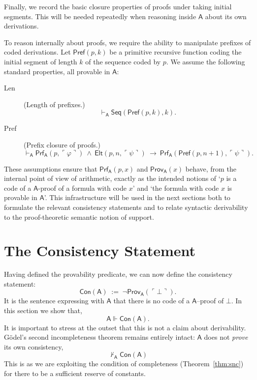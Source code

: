 \documentclass[reqno]{asl}
\makeatletter
\def\namedlabel#1#2{\begingroup
   \def\@currentlabel{#2}%
   \label{#1}\endgroup
}
\newcommand{\proves}{\vdash}
\newcommand{\supp}{\Vdash}
\newcommand{\pa}{\textsf{A}}
\newcommand{\Prf}{\textsf{Prf}}
\newcommand{\Seq}{\textsf{Seq}}
\newcommand{\Prov}{\textsf{Prov}}
\newcommand{\Con}{\textsf{Con}}
\newcommand{\Elt}{\textsf{Elt}}
\newcommand{\Pre}{\textsf{Pref}}
\makeatother
\begin{document}
Finally, we record the basic closure properties of proofs under taking initial segments. This will be needed repeatedly when reasoning inside $\pa$ about its own derivations.

To reason internally about proofs, we require the ability to manipulate prefixes of coded derivations. Let $\Pre(p,k)$ be a primitive recursive function coding the initial segment of length $k$ of the sequence coded by $p$. We assume the following standard properties, all provable in $\pa$:

\begin{description}
\item[Len] \namedlabel{desc:prefix-length}{\textbf{Len}} (Length of prefixes.)
\[
\proves_{\pa} \Seq(\Pre(p,k),k).
\]

\item[Pref] \namedlabel{desc:prefix-closure}{\textbf{Pref}} (Prefix closure of proofs.)
\[
\proves_{\pa} 
\Prf_{\pa}(p,\ulcorner\varphi\urcorner) \ \wedge\ \Elt(p,n,\ulcorner\psi\urcorner)
\ \rightarrow\ 
\Prf_{\pa}(\Pre(p,n+1), \ulcorner\psi\urcorner).
\]
\end{description}
\medskip

These assumptions ensure that $\Prf_{\pa}(p,x)$ and $\Prov_{\pa}(x)$ behave, from the internal point of view of arithmetic, exactly as the intended notions of `$p$ is a code of a $\pa$-proof of a formula with code $x$' and `the formula with code $x$ is provable in $\pa$'. This infrastructure will be used in the next sections both to formulate the relevant consistency statements and to relate syntactic derivability to the proof-theoretic semantic notion of support.


\section{The Consistency Statement} \label{sec:main}

Having defined the provability predicate, we can now define the consistency statement:
\[
\Con(\pa) \;:=\; \neg \Prov_{\pa}(\ulcorner\bot\urcorner).
\]
It is the sentence expressing with $\pa$ that there is no code of a $\pa$--proof of $\bot$. In this section we show that,
\[
    \pa \supp \Con(\pa).
\]
It is important to stress at the outset that this is not a claim about 
derivability. G\"odel's second incompleteness theorem remains entirely 
intact: $\pa$ does not \emph{prove} its own consistency,
\[
\not \proves_{\pa} \Con(\pa)
\]
This is as we are exploiting the condition of completeness (Theorem~\ref{thm:snc}) for there to be a sufficient reserve of constants. 
\end{document}
